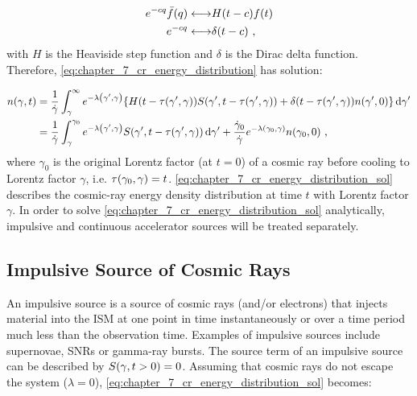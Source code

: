 \begin{equation}
    \begin{alignedat}{2}
    e^{-cq}\bar{f}\qty(q) &\longleftrightarrow && H\qty(t-c)f\qty(t) \\
    e^{-cq} &\longleftrightarrow && \delta\qty(t-c)\text{ ,}
\end{alignedat}
\end{equation}
\noindent with $H$ is the Heaviside step function and $\delta$ is the Dirac delta function. Therefore, \autoref{eq:chapter_7_cr_energy_distribution} has solution:

\begin{equation}
    \begin{aligned}
        n\qty(\gamma,t)&=\frac{1}{\dot{\gamma}}\int_\gamma^\infty e^{-\lambda\qty(\gamma',\gamma)} \qty{H\qty(t-\tau\qty(\gamma',\gamma))S\qty(\gamma',t-\tau\qty(\gamma',\gamma))+\delta\qty(t-\tau\qty(\gamma',\gamma))n\qty(\gamma',0)}\dd{\gamma'}  \\
        &=\frac{1}{\dot{\gamma}}\int_\gamma^{\gamma_0}  e^{-\lambda\qty(\gamma',\gamma)} S\qty(\gamma',t-\tau\qty(\gamma',\gamma))\dd{\gamma'}  + \frac{\dot{\gamma}_0}{\dot{\gamma}}e^{-\lambda\qty(\gamma_0,\gamma)} n\qty(\gamma_0,0)\text{ ,}
    \end{aligned}  \label{eq:chapter_7_cr_energy_distribution_sol}
\end{equation}
\noindent where $\gamma_0$ is the original Lorentz factor (at $t=0$) of a cosmic ray before cooling to Lorentz factor $\gamma$, i.e. $\tau\qty(\gamma_0,\gamma)=t$. \autoref{eq:chapter_7_cr_energy_distribution_sol} describes the cosmic-ray energy density distribution at time $t$ with Lorentz factor $\gamma$. In order to solve \autoref{eq:chapter_7_cr_energy_distribution_sol} analytically, impulsive and continuous accelerator sources will be treated separately. 

\subsection{Impulsive Source of Cosmic Rays}

An impulsive source is a source of cosmic rays (and/or electrons) that injects material into the ISM at one point in time instantaneously or over a time period much less than the observation time. Examples of impulsive sources include supernovae, SNRs or gamma-ray bursts. The source term of an impulsive source can be described by $S\qty(\gamma,t>0)=0$. Assuming that cosmic rays do not escape the system ($\lambda=0$), \autoref{eq:chapter_7_cr_energy_distribution_sol} becomes:

